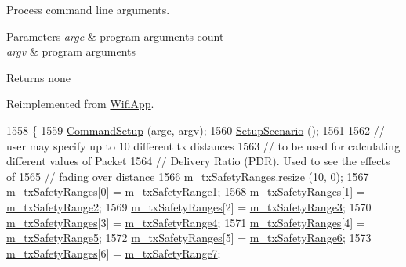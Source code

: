 Process command line arguments. 


\begin{DoxyParams}{Parameters}
{\em argc} & program arguments count \\
\hline
{\em argv} & program arguments \\
\hline
\end{DoxyParams}
\begin{DoxyReturn}{Returns}
none 
\end{DoxyReturn}


Reimplemented from \hyperlink{classWifiApp_a5b5615c4bf7856b9730528673228eea0}{Wifi\+App}.


\begin{DoxyCode}
1558 \{
1559   \hyperlink{classVanetRoutingExperiment_a6faaa1c235b5a015a5896be6fe6e6903}{CommandSetup} (argc, argv);
1560   \hyperlink{classVanetRoutingExperiment_a5f50bb63ebd19bca0b2093b119e85aa2}{SetupScenario} ();
1561 
1562   \textcolor{comment}{// user may specify up to 10 different tx distances}
1563   \textcolor{comment}{// to be used for calculating different values of Packet}
1564   \textcolor{comment}{// Delivery Ratio (PDR). Used to see the effects of}
1565   \textcolor{comment}{// fading over distance}
1566   \hyperlink{classVanetRoutingExperiment_a6cd05046b2e71e266ee72b0d31f8dcc9}{m\_txSafetyRanges}.resize (10, 0);
1567   \hyperlink{classVanetRoutingExperiment_a6cd05046b2e71e266ee72b0d31f8dcc9}{m\_txSafetyRanges}[0] = \hyperlink{classVanetRoutingExperiment_a32c5e4c13fb04e76a1165d281d46523c}{m\_txSafetyRange1};
1568   \hyperlink{classVanetRoutingExperiment_a6cd05046b2e71e266ee72b0d31f8dcc9}{m\_txSafetyRanges}[1] = \hyperlink{classVanetRoutingExperiment_ae6eed15f9f0ce82f650c646e208e2c5e}{m\_txSafetyRange2};
1569   \hyperlink{classVanetRoutingExperiment_a6cd05046b2e71e266ee72b0d31f8dcc9}{m\_txSafetyRanges}[2] = \hyperlink{classVanetRoutingExperiment_a5d3559c0aebe92a46501b21b57a96fad}{m\_txSafetyRange3};
1570   \hyperlink{classVanetRoutingExperiment_a6cd05046b2e71e266ee72b0d31f8dcc9}{m\_txSafetyRanges}[3] = \hyperlink{classVanetRoutingExperiment_a9935d9bd1426b35bf7e5921f478034a9}{m\_txSafetyRange4};
1571   \hyperlink{classVanetRoutingExperiment_a6cd05046b2e71e266ee72b0d31f8dcc9}{m\_txSafetyRanges}[4] = \hyperlink{classVanetRoutingExperiment_a2b3e42d76f8d74100087b633e4b9295f}{m\_txSafetyRange5};
1572   \hyperlink{classVanetRoutingExperiment_a6cd05046b2e71e266ee72b0d31f8dcc9}{m\_txSafetyRanges}[5] = \hyperlink{classVanetRoutingExperiment_a19582595367bfd9fde2febb9108b6fea}{m\_txSafetyRange6};
1573   \hyperlink{classVanetRoutingExperiment_a6cd05046b2e71e266ee72b0d31f8dcc9}{m\_txSafetyRanges}[6] = \hyperlink{classVanetRoutingExperiment_a5d3143091b54bcabaf43bea41d464bdb}{m\_txSafetyRange7};

\end{DoxyCode}
